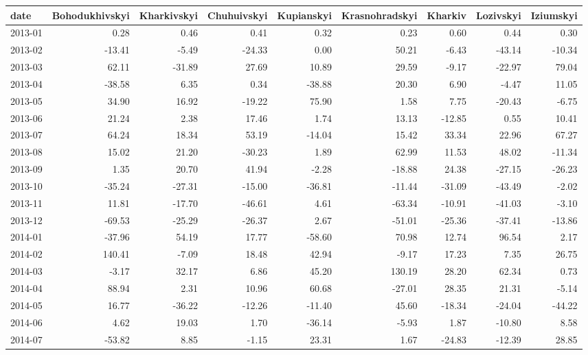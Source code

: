 \begin{table}[ht]
\centering
\begin{tabular}{lrrrrrrrr}
  \hline
date & Bohodukhivskyi & Kharkivskyi & Chuhuivskyi & Kupianskyi & Krasnohradskyi & Kharkiv & Lozivskyi & Iziumskyi \\ 
  \hline
2013-01 & 0.28 & 0.46 & 0.41 & 0.32 & 0.23 & 0.60 & 0.44 & 0.30 \\ 
  2013-02 & -13.41 & -5.49 & -24.33 & 0.00 & 50.21 & -6.43 & -43.14 & -10.34 \\ 
  2013-03 & 62.11 & -31.89 & 27.69 & 10.89 & 29.59 & -9.17 & -22.97 & 79.04 \\ 
  2013-04 & -38.58 & 6.35 & 0.34 & -38.88 & 20.30 & 6.90 & -4.47 & 11.05 \\ 
  2013-05 & 34.90 & 16.92 & -19.22 & 75.90 & 1.58 & 7.75 & -20.43 & -6.75 \\ 
  2013-06 & 21.24 & 2.38 & 17.46 & 1.74 & 13.13 & -12.85 & 0.55 & 10.41 \\ 
  2013-07 & 64.24 & 18.34 & 53.19 & -14.04 & 15.42 & 33.34 & 22.96 & 67.27 \\ 
  2013-08 & 15.02 & 21.20 & -30.23 & 1.89 & 62.99 & 11.53 & 48.02 & -11.34 \\ 
  2013-09 & 1.35 & 20.70 & 41.94 & -2.28 & -18.88 & 24.38 & -27.15 & -26.23 \\ 
  2013-10 & -35.24 & -27.31 & -15.00 & -36.81 & -11.44 & -31.09 & -43.49 & -2.02 \\ 
  2013-11 & 11.81 & -17.70 & -46.61 & 4.61 & -63.34 & -10.91 & -41.03 & -3.10 \\ 
  2013-12 & -69.53 & -25.29 & -26.37 & 2.67 & -51.01 & -25.36 & -37.41 & -13.86 \\ 
  2014-01 & -37.96 & 54.19 & 17.77 & -58.60 & 70.98 & 12.74 & 96.54 & 2.17 \\ 
  2014-02 & 140.41 & -7.09 & 18.48 & 42.94 & -9.17 & 17.23 & 7.35 & 26.75 \\ 
  2014-03 & -3.17 & 32.17 & 6.86 & 45.20 & 130.19 & 28.20 & 62.34 & 0.73 \\ 
  2014-04 & 88.94 & 2.31 & 10.96 & 60.68 & -27.01 & 28.35 & 21.31 & -5.14 \\ 
  2014-05 & 16.77 & -36.22 & -12.26 & -11.40 & 45.60 & -18.34 & -24.04 & -44.22 \\ 
  2014-06 & 4.62 & 19.03 & 1.70 & -36.14 & -5.93 & 1.87 & -10.80 & 8.58 \\ 
  2014-07 & -53.82 & 8.85 & -1.15 & 23.31 & 1.67 & -24.83 & -12.39 & 28.85 \\ 

\end{tabular}
\end{table}
